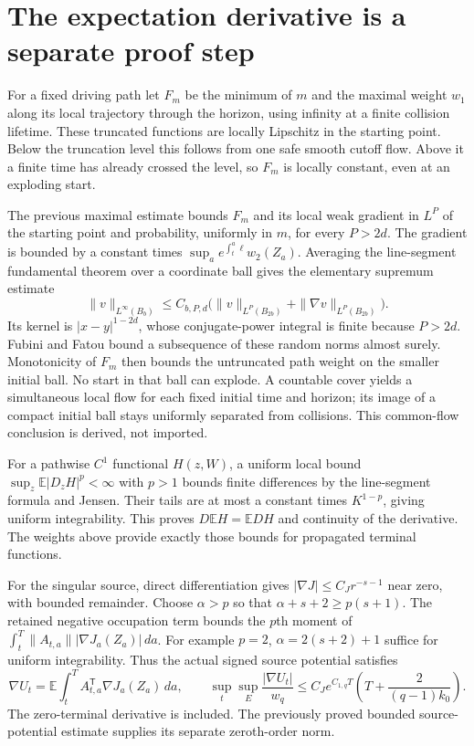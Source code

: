 \documentclass[10pt]{article}
\newcommand{\E}{\mathbb E}
\begin{document}
\section*{The expectation derivative is a separate proof step}
For a fixed driving path let $F_m$ be the minimum of $m$ and the maximal
weight $w_1$ along its local trajectory through the horizon, using infinity
at a finite collision lifetime. These truncated functions are locally
Lipschitz in the starting point. Below the truncation level this follows
from one safe smooth cutoff flow. Above it a finite time has already crossed
the level, so $F_m$ is locally constant, even at an exploding start.

The previous maximal estimate bounds $F_m$ and its local weak gradient in
$L^P$ of the starting point and probability, uniformly in $m$, for every
$P>2d$. The gradient is bounded by a constant times
$\sup_a e^{\int_t^a\ell}w_2(Z_a)$. Averaging the line-segment fundamental
theorem over a coordinate ball gives the elementary supremum estimate
\[
 \|v\|_{L^\infty(B_b)}\le C_{b,P,d}
       \bigl(\|v\|_{L^P(B_{2b})}+\|\nabla v\|_{L^P(B_{2b})}\bigr).
\]
Its kernel is $|x-y|^{1-2d}$, whose conjugate-power integral is finite because
$P>2d$. Fubini and Fatou bound a subsequence of these random norms almost
surely. Monotonicity of $F_m$ then bounds the untruncated path weight on the
smaller initial ball. No start in that ball can explode. A countable cover
yields a simultaneous local flow for each fixed initial time and horizon;
its image of a compact initial ball stays uniformly separated from collisions.
This common-flow conclusion is derived, not imported.

For a pathwise $C^1$ functional $H(z,W)$, a uniform local bound
$\sup_z\E|D_zH|^p<\infty$ with $p>1$ bounds finite differences by the
line-segment formula and Jensen. Their tails are at most a constant times
$K^{1-p}$, giving uniform integrability. This proves
$D\E H=\E DH$ and continuity of the derivative. The weights above provide
exactly those bounds for propagated terminal functions.

For the singular source, direct differentiation gives
$|\nabla J|\le C_Jr^{-s-1}$ near zero, with bounded remainder. Choose
$\alpha>p$ so that $\alpha+s+2\ge p(s+1)$. The retained negative occupation
term bounds the $p$th moment of
$\int_t^T\|A_{t,a}\||\nabla J_a(Z_a)|\,da$.
For example $p=2$, $\alpha=2(s+2)+1$ suffice for uniform integrability.
Thus the actual signed source potential satisfies
\[
 \nabla U_t=\E\int_t^T A_{t,a}^{\mathsf T}\nabla J_a(Z_a)\,da,
 \qquad
 \sup_t\sup_E\frac{|\nabla U_t|}{w_q}
 \le C_J e^{C_{1,q}T}
       \left(T+\frac{2}{(q-1)k_0}\right).
\]
The zero-terminal derivative is included. The previously proved bounded
source-potential estimate supplies its separate zeroth-order norm.
\end{document}
